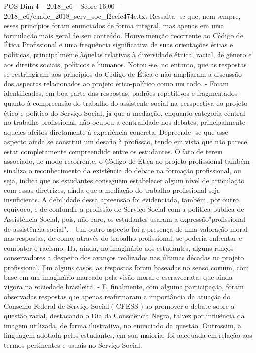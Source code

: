 \begin{textsample}{POS Dim 4 – 2018\_c6 – Score 16.00 – 2018\_c6/enade\_2018\_serv\_soc\_f2ecfc474e.txt}
Ressalta -se que, nem sempre, esses princípios foram enunciados de forma integral, mas apenas em uma formulação mais geral de seu conteúdo.
Houve menção recorrente ao Código de Ética Profissional e uma frequência significativa de suas orientações éticas e políticas, principalmente àquelas relativas à diversidade étnica, racial, de gênero e aos direitos sociais, políticos e humanos.
Notou -se, no entanto, que as respostas se restringiram aos princípios do Código de Ética e não ampliaram a discussão dos aspectos relacionados ao projeto ético-político como um todo. - Foram identificados, em boa parte das respostas, padrões repetitivos e fragmentados quanto à compreensão do trabalho do assistente social na perspectiva do projeto ético e político do Serviço Social, já que a mediação, enquanto categoria central no trabalho profissional, não ocupou a centralidade nos debates, principalmente aqueles afeitos diretamente à experiência concreta.
Depreende -se que esse aspecto ainda se constitui um desafio à profissão, tendo em vista que não parece estar completamente compreendido entre os estudantes.
O fato de terem associado, de modo recorrente, o Código de Ética ao projeto profissional também sinaliza o reconhecimento da existência do debate na formação profissional, ou seja, indica que os estudantes conseguem estabelecer algum nível de articulação com essas diretrizes, ainda que a mediação do trabalho profissional seja insuficiente.
A debilidade dessa apreensão foi evidenciada, também, por outro equívoco, o de confundir a profissão de Serviço Social com a política pública de Assistência Social, pois, não raro, os estudantes usaram a expressão"profissional de assistência social". - Um outro aspecto foi a presença de uma valoração moral nas respostas, de como, através do trabalho profissional, se poderia enfrentar e combater o racismo.
Há, ainda, no imaginário dos estudantes, alguns ranços conservadores a despeito dos avanços realizados nas últimas décadas no projeto profissional.
Em alguns casos, as respostas foram baseadas no senso comum, com base em um imaginário marcado pela visão moral e escravocrata, que ainda vigora na sociedade brasileira. - E, finalmente, com alguma participação, foram observadas respostas que apenas reafirmaram a importância da atuação do Conselho Federal de Serviço Social ( CFESS ) ao promover o debate sobre a questão racial, destacando o Dia da Consciência Negra, talvez por influência da imagem utilizada, de forma ilustrativa, no enunciado da questão.
Outrossim, a linguagem adotada pelos estudantes, em sua maioria, foi adequada em relação aos termos pertinentes e usuais no Serviço Social.

\end{textsample}
